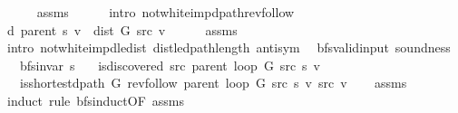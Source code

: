 \begin{isabellebody}
\ \ \ \ \isamarkupfalse%
\ assms\isanewline
\ \ \ \ \isamarkupfalse%
\ {\isacharparenleft}{\kern0pt}intro\ not{\isacharunderscore}{\kern0pt}white{\isacharunderscore}{\kern0pt}imp{\isacharunderscore}{\kern0pt}dpath{\isacharunderscore}{\kern0pt}rev{\isacharunderscore}{\kern0pt}follow{\isacharparenright}{\kern0pt}\isanewline
\ \ \isamarkupfalse%
\ {\isachardoublequoteopen}d\ {\isacharparenleft}{\kern0pt}parent\ s{\isacharparenright}{\kern0pt}\ v\ {\isacharequal}{\kern0pt}\ dist\ G\ src\ v{\isachardoublequoteclose}\isanewline
\ \ \ \ \isamarkupfalse%
\ assms\isanewline
\ \ \ \ \isamarkupfalse%
\ {\isacharparenleft}{\kern0pt}intro\ not{\isacharunderscore}{\kern0pt}white{\isacharunderscore}{\kern0pt}imp{\isacharunderscore}{\kern0pt}d{\isacharunderscore}{\kern0pt}le{\isacharunderscore}{\kern0pt}dist\ dist{\isacharunderscore}{\kern0pt}le{\isacharunderscore}{\kern0pt}dpath{\isacharunderscore}{\kern0pt}length\ antisym{\isacharparenright}{\kern0pt}\isanewline
{}\isamarkupfalse%
%
\endisatagproof
{\isafoldproof}%
%
\isadelimproof
\isanewline
%
\endisadelimproof
\isanewline
{}\isamarkupfalse%
\ {\isacharparenleft}{\kern0pt}\ bfs{\isacharunderscore}{\kern0pt}valid{\isacharunderscore}{\kern0pt}input{\isacharparenright}{\kern0pt}\ soundness{\isacharcolon}{\kern0pt}\isanewline
\ \ \ {\isachardoublequoteopen}bfs{\isacharunderscore}{\kern0pt}invar{\isacharprime}{\kern0pt}{\isacharprime}{\kern0pt}\ s{\isachardoublequoteclose}\isanewline
\ \ \ {\isachardoublequoteopen}is{\isacharunderscore}{\kern0pt}discovered\ src\ {\isacharparenleft}{\kern0pt}parent\ {\isacharparenleft}{\kern0pt}loop\ G\ src\ s{\isacharparenright}{\kern0pt}{\isacharparenright}{\kern0pt}\ v{\isachardoublequoteclose}\isanewline
\ \ \ {\isachardoublequoteopen}is{\isacharunderscore}{\kern0pt}shortest{\isacharunderscore}{\kern0pt}dpath\ G\ {\isacharparenleft}{\kern0pt}rev{\isacharunderscore}{\kern0pt}follow\ {\isacharparenleft}{\kern0pt}parent\ {\isacharparenleft}{\kern0pt}loop\ G\ src\ s{\isacharparenright}{\kern0pt}{\isacharparenright}{\kern0pt}\ v{\isacharparenright}{\kern0pt}\ src\ v{\isachardoublequoteclose}\isanewline
%
\isadelimproof
\ \ %
\endisadelimproof
%
\isatagproof
{}\isamarkupfalse%
\ assms\isanewline
{}\isamarkupfalse%
\ {\isacharparenleft}{\kern0pt}induct\ rule{\isacharcolon}{\kern0pt}\ bfs{\isacharunderscore}{\kern0pt}induct{\isacharbrackleft}{\kern0pt}OF\ assms{\isacharparenleft}{\kern0pt}{}{\isacharparenright}{\kern0pt}{\isacharbrackright}{\kern0pt}{\isacharparenright}{\kern0pt}\isanewline

\end{isabellebody}
